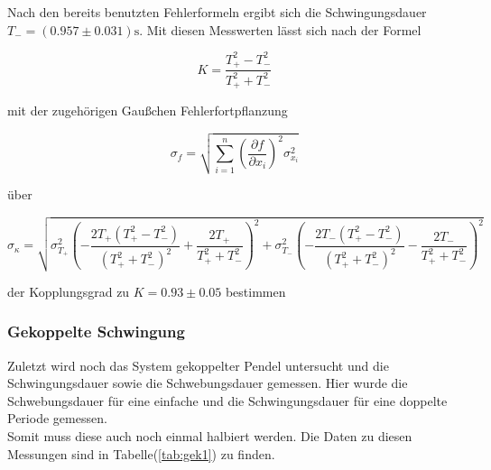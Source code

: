             \noindent Nach den bereits benutzten Fehlerformeln ergibt sich die Schwingungsdauer $T_- = (0.957 \pm 0.031) \si{\second}$.
            Mit diesen Messwerten lässt sich nach der Formel 

            \begin{equation*}
            K = \frac{T_{+}^2 - T_{-}^2}{T_{+}^2 + T_{-}^2} 
            \end{equation*}

            \noindent mit der zugehörigen Gaußchen Fehlerfortpflanzung
            
            \begin{equation}
            \sigma_f = \sqrt{\sum_{i=1}^{n} \left( \frac{\partial f}{\partial x_i} \right)^2 \sigma_{x_i}^2}
            \label{eqn:gauss}
            \end{equation}
            
            \noindent über

            \begin{equation*}
                \sigma_{\kappa} = \sqrt{\sigma_{T_{+}}^{2} \left(- \frac{2 T_{+} \left(T_{+}^{2} - T_{-}^{2}\right)}{\left(T_{+}^{2}
                 + T_{-}^{2}\right)^{2}} + \frac{2 T_{+}}{T_{+}^{2} + T_{-}^{2}}\right)^{2} + \sigma_{T_{-}}^{2} \left(- \frac{2 T_{-}
                  \left(T_{+}^{2} - T_{-}^{2}\right)}{\left(T_{+}^{2} + T_{-}^{2}\right)^{2}} - \frac{2 T_{-}}{T_{+}^{2} + T_{-}^{2}}\right)^{2}}
            \end{equation*}

            \noindent der Kopplungsgrad zu $K = 0.93 \pm 0.05$ bestimmen

        \subsubsection{Gekoppelte Schwingung}

            \noindent Zuletzt wird noch das System gekoppelter Pendel untersucht und die Schwingungsdauer sowie die Schwebungsdauer gemessen. 
            Hier wurde die Schwebungsdauer für eine einfache und die Schwingungsdauer für eine doppelte Periode gemessen.\\
            Somit muss diese auch noch einmal halbiert werden. 
            Die Daten zu diesen Messungen sind in Tabelle(\ref{tab:gek1}) zu finden.

